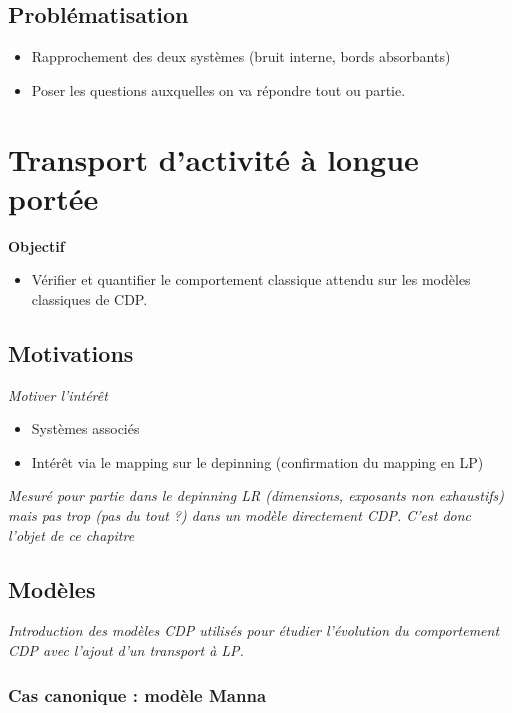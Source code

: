 \documentclass[10pt,a4paper]{article}
\begin{document}
\subsection{Problématisation}

\begin{itemize}
	\item Rapprochement des deux systèmes (bruit interne, bords absorbants)
	\item Poser les questions auxquelles on va répondre tout ou partie.
\end{itemize}

\section{Transport d'activité à longue portée}

\textbf{Objectif}

\begin{itemize}
	\item Vérifier et quantifier le comportement classique attendu sur les modèles classiques de CDP.
\end{itemize}

\subsection{Motivations}

\textit{Motiver l'intérêt}

\begin{itemize}
	\item Systèmes associés
	\item Intérêt via le mapping sur le depinning (confirmation du mapping en LP)
\end{itemize}

\textit{Mesuré pour partie dans le depinning LR (dimensions, exposants non exhaustifs) mais pas trop (pas du tout ?) dans un modèle directement CDP. C'est donc l'objet de ce chapitre}

\subsection{Modèles}

\textit{Introduction des modèles CDP utilisés pour étudier l'évolution du comportement CDP avec l'ajout d'un transport à LP.}

\subsubsection{Cas canonique : modèle Manna}
\end{document}
